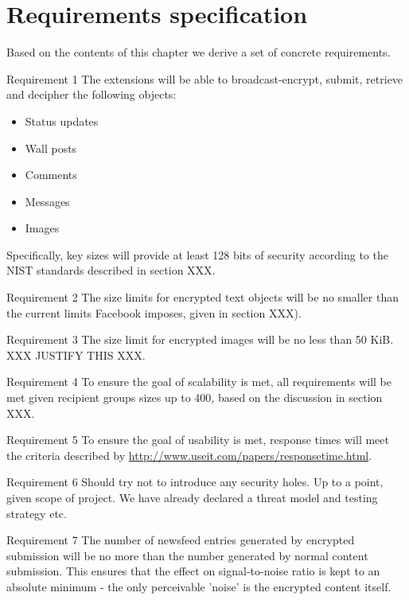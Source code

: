\FloatBarrier
\section{Requirements specification}

Based on the contents of this chapter we derive a set of concrete requirements.
        
\begin{desc}

    \item[Requirement 1] The extensions will be able to broadcast-encrypt, submit, retrieve and decipher the following objects:
    
    \begin{itemize}
        \item Status updates
        \item Wall posts
        \item Comments
        \item Messages
        \item Images
    \end{itemize}
    
    Specifically, key sizes will provide at least 128 bits of security according to the NIST standards described in section XXX.
    
    \item[Requirement 2] The size limits for encrypted text objects will be no smaller than the current limits Facebook imposes, given in section XXX).

    \item[Requirement 3] The size limit for encrypted images will be no less than 50 KiB. XXX JUSTIFY THIS XXX.

    \item[Requirement 4] To ensure the goal of scalability is met, all requirements will be met given recipient groups sizes up to 400, based on the discussion in section XXX.
    
    
    \item[Requirement 5] To ensure the goal of usability is met, response times will meet the criteria described by \url{http://www.useit.com/papers/responsetime.html}.


    \item[Requirement 6] Should try not to introduce any security holes. Up to a point, given scope of project. We have already declared a threat model and testing strategy etc.


    \item[Requirement 7] The number of newsfeed entries generated by encrypted submission will be no more than the number generated by normal content submission. This ensures that the effect on signal-to-noise ratio is kept to an absolute minimum - the only perceivable 'noise' is the encrypted content itself.
    


\end{desc}
